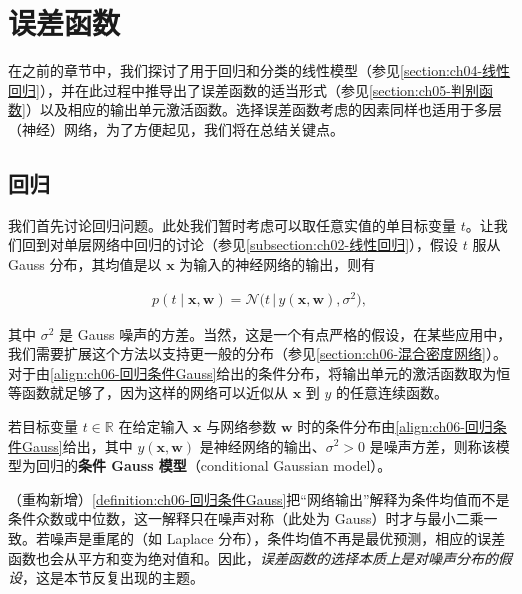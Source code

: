 \documentclass[../../main.tex]{subfiles}
\begin{document}
\section{误差函数}\label{section:ch06-误差函数}

在之前的章节中，我们探讨了用于回归和分类的线性模型（参见\cref{section:ch04-线性回归}），并在此过程中推导出了误差函数的适当形式（参见\cref{section:ch05-判别函数}）以及相应的输出单元激活函数。选择误差函数考虑的因素同样也适用于多层（神经）网络，为了方便起见，我们将在总结关键点。

\subsection{回归}\label{subsection:ch06-回归}

我们首先讨论回归问题。此处我们暂时考虑可以取任意实值的单目标变量 $t$。让我们回到对单层网络中回归的讨论（参见\cref{subsection:ch02-线性回归}），假设 $t$ 服从 Gauss 分布，其均值是以 $\boldsymbol{x}$ 为输入的神经网络的输出，则有

\begin{align}
p(t\mid\boldsymbol{x},\boldsymbol{w})=\mathcal{N}\bigl(t\,\big|\,y(\boldsymbol{x},\boldsymbol{w}),\sigma^{2}\bigr),
\label{align:ch06-回归条件Gauss}
\end{align}

其中 $\sigma^{2}$ 是 Gauss 噪声的方差。当然，这是一个有点严格的假设，在某些应用中，我们需要扩展这个方法以支持更一般的分布（参见\cref{section:ch06-混合密度网络}）。对于由\eqref{align:ch06-回归条件Gauss}给出的条件分布，将输出单元的激活函数取为恒等函数就足够了，因为这样的网络可以近似从 $\boldsymbol{x}$ 到 $y$ 的任意连续函数。

\begin{definition}\label{definition:ch06-回归条件Gauss}
若目标变量 $t\in\mathbb{R}$ 在给定输入 $\boldsymbol{x}$ 与网络参数 $\boldsymbol{w}$ 时的条件分布由\eqref{align:ch06-回归条件Gauss}给出，其中 $y(\boldsymbol{x},\boldsymbol{w})$ 是神经网络的输出、$\sigma^{2}>0$ 是噪声方差，则称该模型为回归的\textbf{条件 Gauss 模型}（conditional Gaussian model）。
\end{definition}

\begin{remark}（重构新增）\cref{definition:ch06-回归条件Gauss}把“网络输出”解释为条件均值而不是条件众数或中位数，这一解释只在噪声对称（此处为 Gauss）时才与最小二乘一致。若噪声是重尾的（如 Laplace 分布），条件均值不再是最优预测，相应的误差函数也会从平方和变为绝对值和。因此，\emph{误差函数的选择本质上是对噪声分布的假设}，这是本节反复出现的主题。
\end{remark}
\end{document}
